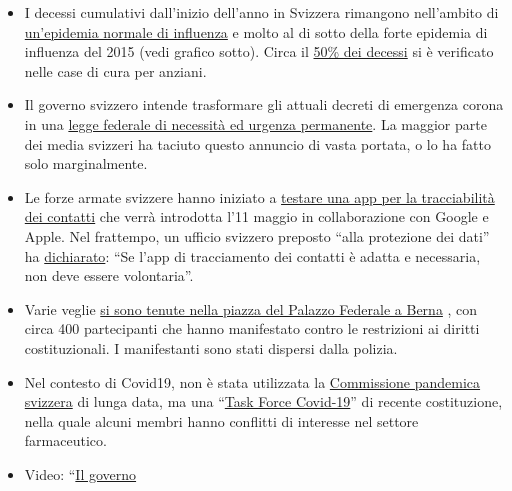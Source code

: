 \begin{itemize}
\tightlist
\item
  I decessi cumulativi dall'inizio dell'anno in Svizzera rimangono
  nell'ambito di
  \href{https://swprs.files.wordpress.com/2020/05/schweiz-todesfaelle-2010-2020_woche_17.pdf}{un'epidemia
  normale di influenza} e molto al di sotto della forte epidemia di
  influenza del 2015 (vedi grafico sotto). Circa il
  \href{https://www.bluewin.ch/de/news/schweiz/sp-chef-levrat-will-die-reichen-schropfen-383977.html}{50\%
  dei decessi} si è verificato nelle case di cura per anziani.
\item
  Il governo svizzero intende trasformare gli attuali decreti di
  emergenza corona in una
  \href{https://www.admin.ch/gov/de/start/dokumentation/medienmitteilungen.msg-id-78929.html}{legge
  federale di necessità ed urgenza permanente}. La maggior parte dei
  media svizzeri ha taciuto questo annuncio di vasta portata, o lo ha
  fatto solo marginalmente.
\item
  Le forze armate svizzere hanno iniziato a
  \href{https://uncut-news.ch/wp-content/uploads/2020/05/Schweizer-Soldaten-k\%C3\%A4mpfen-bewaffnet-mit-Bluetooth-App-gegen-COVID-19.pdf}{testare
  una app per la tracciabilità dei contatti} che verrà introdotta l'11
  maggio in collaborazione con Google e Apple. Nel frattempo, un ufficio
  svizzero preposto ``alla protezione dei dati'' ha
  \href{https://www.nzz.ch/zuerich/coronavirus-in-zuerich-tracing-app-braucht-keine-freiwilligkeit-ld.1553964}{dichiarato}:
  ``Se l'app di tracciamento dei contatti è adatta e necessaria, non
  deve essere volontaria''.
\item
  Varie veglie
  \href{https://www.zeitpunkt.ch/index.php/mahnwache-fuer-grundrechte-400-menschen-auf-dem-bundesplatz-wie-aus-dem-nichts}{si
  sono tenute nella piazza del Palazzo Federale a Berna} , con circa 400
  partecipanti che hanno manifestato contro le restrizioni ai diritti
  costituzionali. I manifestanti sono stati dispersi dalla polizia.
\item
  Nel contesto di Covid19, non è stata utilizzata la
  \href{https://www.srf.ch/news/schweiz/bag-verzichtete-auf-beratung-was-macht-die-pandemie-kommission-in-der-krise}{Commissione
  pandemica svizzera} di lunga data, ma una
  ``\href{https://ncs-tf.ch/de/organisation}{Task Force Covid-19}'' di
  recente costituzione, nella quale alcuni membri hanno conflitti di
  interesse nel settore farmaceutico.
\item
  Video: ``\href{https://www.youtube.com/watch?v=RyZGkdeQ6CY}{Il governo
}
\end{itemize}
